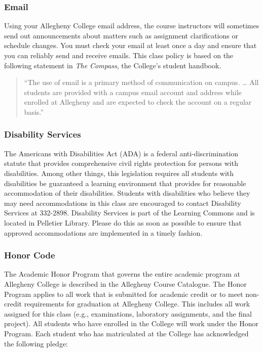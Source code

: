 \vspace{-.10in}
\subsubsection*{Email}

Using your Allegheny College email address, the course instructors will sometimes send out announcements about matters
such as assignment clarifications or schedule changes. You must check your email at least once a day and ensure that
you can reliably send and receive emails. This class policy is based on the following statement in {\em The Compass},
the College's student handbook.

\begin{quote}
``The use of email is a primary method of communication on campus. \ldots
All students are provided with a campus email account and address while
enrolled at Allegheny and are expected to check the account on a regular
basis.'' 
\end{quote}

\vspace*{-.30in}
\subsubsection*{Disability Services}

The Americans with Disabilities Act (ADA) is a federal anti-discrimination statute that provides comprehensive civil
rights protection for persons with disabilities.  Among other things, this legislation requires all students with
disabilities be guaranteed a learning environment that provides for reasonable accommodation of their disabilities.
Students with disabilities who believe they may need accommodations in this class are encouraged to contact Disability
Services at 332-2898.  Disability Services is part of the Learning Commons and is located in Pelletier Library.
Please do this as soon as possible to ensure that approved accommodations are implemented in a timely fashion.

\vspace{-.20in}
\subsubsection*{Honor Code}

The Academic Honor Program that governs the entire academic program at Allegheny College is described in the Allegheny
Course Catalogue.  The Honor Program applies to all work that is submitted for academic credit or to meet non-credit
requirements for graduation at Allegheny College.  This includes all work assigned for this class (e.g., examinations,
laboratory assignments, and the final project).  All students who have enrolled in the College will work under the Honor
Program.  Each student who has matriculated at the College has acknowledged the following pledge:

